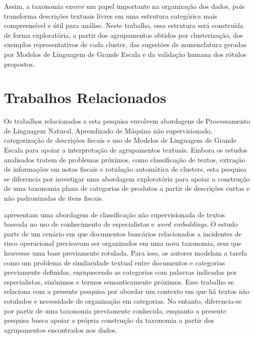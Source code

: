 \documentclass[english,brazilian]{UNISINOSmonografia}
\begin{document}
Assim, a taxonomia exerce um papel importante na organização dos dados, pois transforma descrições textuais livres em uma estrutura categórica mais compreensível e útil para análise. Neste trabalho, essa estrutura será construída de forma exploratória, a partir dos agrupamentos obtidos por clusterização, dos exemplos representativos de cada cluster, das sugestões de nomenclatura geradas por Modelos de Linguagem de Grande Escala e da validação humana dos rótulos propostos.















\chapter{Trabalhos Relacionados}

Os trabalhos relacionados a esta pesquisa envolvem abordagens de Processamento de Linguagem Natural, Aprendizado de Máquina não supervisionado, categorização de descrições fiscais e uso de Modelos de Linguagem de Grande Escala para apoiar a interpretação de agrupamentos textuais. Embora os estudos analisados tratem de problemas próximos, como classificação de textos, extração de informações em notas fiscais e rotulação automática de clusters, esta pesquisa se diferencia por investigar uma abordagem exploratória para apoiar a construção de uma taxonomia plana de categorias de produtos a partir de descrições curtas e não padronizadas de itens fiscais.

\cite{hajyahia2019unsupervised} apresentam uma abordagem de classificação não supervisionada de textos baseada no uso de conhecimento de especialistas e \textit{word embeddings}. O estudo parte de um cenário em que documentos bancários relacionados a incidentes de risco operacional precisavam ser organizados em uma nova taxonomia, sem que houvesse uma base previamente rotulada. Para isso, os autores modelam a tarefa como um problema de similaridade textual entre documentos e categorias previamente definidas, enriquecendo as categorias com palavras indicadas por especialistas, sinônimos e termos semanticamente próximos. Esse trabalho se relaciona com a presente pesquisa por abordar um contexto em que há textos não rotulados e necessidade de organização em categorias. No entanto, diferencia-se por partir de uma taxonomia previamente conhecida, enquanto a presente pesquisa busca apoiar a própria construção da taxonomia a partir dos agrupamentos encontrados nos dados.
\end{document}
